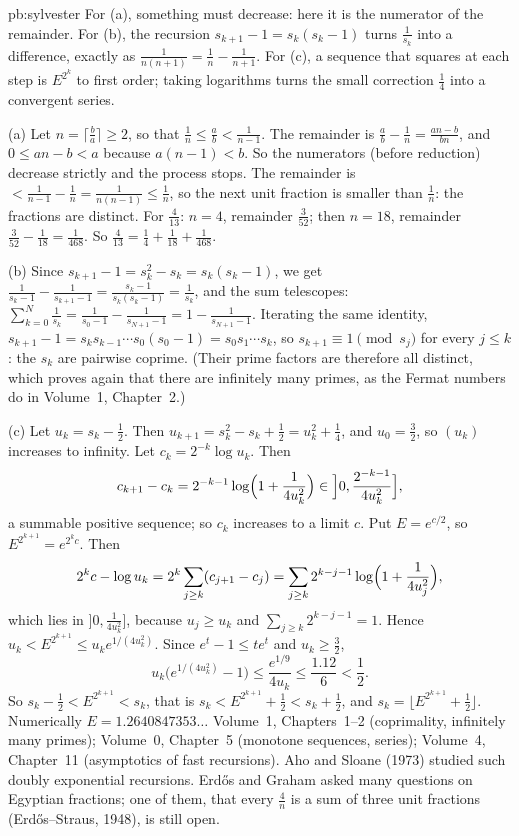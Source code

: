 \begin{solution}{pb:sylvester}
\idea For (a), something must decrease: here it is the numerator of the remainder. For (b), the recursion $s_{k+1}-1=
s_k(s_k-1)$ turns $\frac1{s_k}$ into a difference, exactly as $\frac1{n(n+1)}=\frac1n-\frac1{n+1}$. For (c), a sequence that
squares at each step is $E^{2^k}$ to first order; taking logarithms turns the small correction $\frac14$ into a convergent
series.

\writeup (a) Let $n=\lceil\frac ba\rceil\ge2$, so that $\frac1n\le\frac ab<\frac1{n-1}$. The remainder is
$\frac ab-\frac1n=\frac{an-b}{bn}$, and $0\le an-b<a$ because $a(n-1)<b$. So the numerators (before reduction) decrease
strictly and the process stops. The remainder is $<\frac1{n-1}-\frac1n=\frac1{n(n-1)}\le\frac1n$, so the next unit fraction
is smaller than $\frac1n$: the fractions are distinct. For $\frac4{13}$: $n=4$, remainder $\frac3{52}$; then $n=18$,
remainder $\frac3{52}-\frac1{18}=\frac1{468}$. So $\frac4{13}=\frac14+\frac1{18}+\frac1{468}$.

(b) Since $s_{k+1}-1=s_k^2-s_k=s_k(s_k-1)$, we get $\frac1{s_k-1}-\frac1{s_{k+1}-1}=\frac{s_k-1}{s_k(s_k-1)}=\frac1{s_k}$, and the
sum telescopes: $\sum_{k=0}^N\frac1{s_k}=\frac1{s_0-1}-\frac1{s_{N+1}-1}=1-\frac1{s_{N+1}-1}$. Iterating the same identity,
$s_{k+1}-1=s_ks_{k-1}\cdots s_0(s_0-1)=s_0s_1\cdots s_k$, so $s_{k+1}\equiv1\pmod{s_j}$ for every $j\le k$: the $s_k$ are
pairwise coprime. (Their prime factors are therefore all distinct, which proves again that there are infinitely many primes,
as the Fermat numbers do in Volume~1, Chapter~2.)

(c) Let $u_k=s_k-\frac12$. Then $u_{k+1}=s_k^2-s_k+\frac12=u_k^2+\frac14$, and $u_0=\frac32$, so $(u_k)$ increases to infinity.
Let $c_k=2^{-k}\log u_k$. Then
\[
c_{k+1}-c_k=2^{-k-1}\log\Bigl(1+\frac1{4u_k^2}\Bigr)\in\Bigl]0,\frac{2^{-k-1}}{4u_k^2}\Bigr],
\]
a summable positive sequence; so $c_k$ increases to a limit $c$. Put $E=e^{c/2}$, so $E^{2^{k+1}}=e^{2^kc}$. Then
\[
2^kc-\log u_k=2^k\sum_{j\ge k}(c_{j+1}-c_j)=\sum_{j\ge k}2^{k-j-1}\log\Bigl(1+\frac1{4u_j^2}\Bigr),
\]
which lies in $\bigl]0,\frac1{4u_k^2}\bigr]$, because $u_j\ge u_k$ and $\sum_{j\ge k}2^{k-j-1}=1$. Hence
$u_k<E^{2^{k+1}}\le u_ke^{1/(4u_k^2)}$. Since $e^t-1\le te^t$ and $u_k\ge\frac32$,
\[
u_k\bigl(e^{1/(4u_k^2)}-1\bigr)\le\frac{e^{1/9}}{4u_k}\le\frac{1.12}6<\frac12.
\]
So $s_k-\frac12<E^{2^{k+1}}<s_k$, that is $s_k<E^{2^{k+1}}+\frac12<s_k+\frac12$, and $s_k=\bigl\lfloor E^{2^{k+1}}+\frac12
\bigr\rfloor$. Numerically $E=1.2640847353\ldots$
\tools Volume~1, Chapters~1--2 (coprimality, infinitely many primes); Volume~0, Chapter~5 (monotone sequences, series);
Volume~4, Chapter~11 (asymptotics of fast recursions).
\leads Aho and Sloane (1973) studied such doubly exponential recursions. Erdős and Graham asked many questions on Egyptian
fractions; one of them, that every $\frac4n$ is a sum of three unit fractions (Erdős--Straus, 1948), is still open.
\end{solution}

